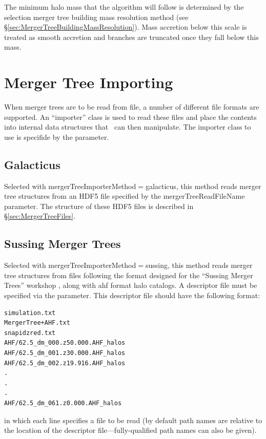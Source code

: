The minimum halo mass that the algorithm will follow is determined by the selection merger tree building mass resolution method (see \S\ref{sec:MergerTreeBuildingMassResolution}). Mass accretion below this scale is treated as smooth accretion and branches are truncated once they fall below this mass.

\section{Merger Tree Importing}\label{sec:MergerTreeImporters}

When merger trees are to be read from file, a number of different file formats are supported. An ``importer'' class is used to read these files and place the contents into internal data structures that \glc\ can then manipulate. The importer class to use is specifide by the {\normalfont \ttfamily [mergerTreeImporterMethod]} parameter.

\subsection{Galacticus}\label{phys:mergerTreeImporter:mergerTreeImporterGalacticus}

Selected with {\normalfont \ttfamily mergerTreeImporterMethod}$=${\normalfont \ttfamily galacticus}, this method reads merger tree structures from an HDF5 file specified by the {\normalfont \ttfamily mergerTreeReadFileName} parameter. The structure of these HDF5 files is described in \S\ref{sec:MergerTreeFiles}.

\subsection{Sussing Merger Trees}\label{phys:mergerTreeImporter:mergerTreeImporterSussing}

Selected with {\normalfont \ttfamily mergerTreeImporterMethod}$=${\normalfont \ttfamily sussing}, this method reads merger tree structures from files following the format designed for the ``Sussing Merger Trees'' workshop \citep{srisawat_sussing_2013}, along with \gls{ahf} format halo catalogs. A descriptor file must be specified via the {\normalfont \ttfamily [mergerTreeReadFileName]} parameter. This descriptor file should have the following format:
\begin{verbatim}
simulation.txt
MergerTree+AHF.txt
snapidzred.txt
AHF/62.5_dm_000.z50.000.AHF_halos
AHF/62.5_dm_001.z30.000.AHF_halos
AHF/62.5_dm_002.z19.916.AHF_halos
.
.
.
AHF/62.5_dm_061.z0.000.AHF_halos
\end{verbatim}
in which each line specifies a file to be read (by default path names are relative to the location of the descriptor file---fully-qualified path names can also be given).

